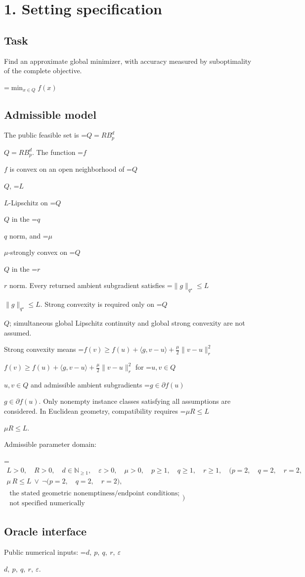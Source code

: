 \documentclass[10pt,a4paper]{article}
\newcommand{\AtlasMath}[1]{\par\begingroup\centering\setbox0=\hbox{$\displaystyle #1$}\ifdim\wd0>1.4\linewidth\typeout{ATLAS WIDE FORMULA: \the\wd0}\fi\ifdim\wd0>\linewidth\resizebox{\linewidth}{!}{\box0}\else\box0\fi\par\endgroup}
\newcommand{\AtlasInlineMath}[1]{\begingroup\setbox0=\hbox{$#1$}\ifdim\wd0>.4\linewidth\endgroup\AtlasMath{#1}\else\endgroup$#1$\fi}
\begin{document}
\section{1. Setting specification}
\subsection{Task}
Find an approximate global minimizer, with accuracy measured by suboptimality of the complete objective.


\AtlasMath{\min_{x\in Q}f(x)}


\subsection{Admissible model}
The public feasible set is \AtlasInlineMath{Q=RB_p^d}. The function \AtlasInlineMath{f} is convex on an open neighborhood of \AtlasInlineMath{Q}, \AtlasInlineMath{L}-Lipschitz on \AtlasInlineMath{Q} in the \AtlasInlineMath{q} norm, and \AtlasInlineMath{\mu}-strongly convex on \AtlasInlineMath{Q} in the \AtlasInlineMath{r} norm. Every returned ambient subgradient satisfies \AtlasInlineMath{\|g\|_{q^\star}\le L}. Strong convexity is required only on \AtlasInlineMath{Q}; simultaneous global Lipschitz continuity and global strong convexity are not assumed.

Strong convexity means \AtlasInlineMath{f(v)\ge f(u)+\langle g,v-u\rangle+\frac\mu2\|v-u\|_r^2} for \AtlasInlineMath{u,v\in Q} and admissible ambient subgradients \AtlasInlineMath{g\in\partial f(u)}. Only nonempty instance classes satisfying all assumptions are considered. In Euclidean geometry, compatibility requires \AtlasInlineMath{\mu R\le L}.

Admissible parameter domain:


\AtlasMath{\begin{gathered}L>0,\quad R>0,\quad d\in\mathbb{N}_{\ge1},\quad \varepsilon>0,\quad \mu>0,\quad p\ge1,\quad q\ge1,\quad r\ge1,\quad \bigl(p=2,\quad q=2,\quad r=2,\\[3pt]\mu\,R\le L\ \lor\ \neg\bigl(p=2,\quad q=2,\quad r=2\bigr),\\[3pt]\substack{\text{the stated geometric nonemptiness/endpoint conditions;}\\\text{not specified numerically}}\bigr)\end{gathered}}


\subsection{Oracle interface}
Public numerical inputs: \AtlasInlineMath{d,\ p,\ q,\ r,\ \varepsilon}.
\end{document}

